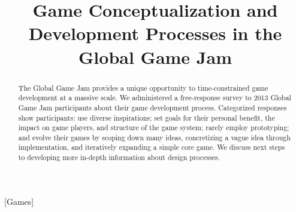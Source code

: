 \documentclass{sig-alternate}
\begin{document}

\title{Game Conceptualization and Development Processes in the Global Game Jam}

\author{}

\maketitle
\begin{abstract}
The Global Game Jam provides a unique opportunity to time-constrained game development at a massive scale.
We administered a free-response survey to 2013 Global Game Jam participants about their game development process. Categorized responses show participants: use diverse inspirations; set goals for their personal benefit, the impact on game players, and structure of the game system; rarely employ prototyping; and evolve their games by scoping down many ideas, concretizing a vague idea through implementation, and iteratively expanding a simple core game.
We discuss next steps to developing more in-depth information about design processes.
\end{abstract}

[Games]
\end{document}
